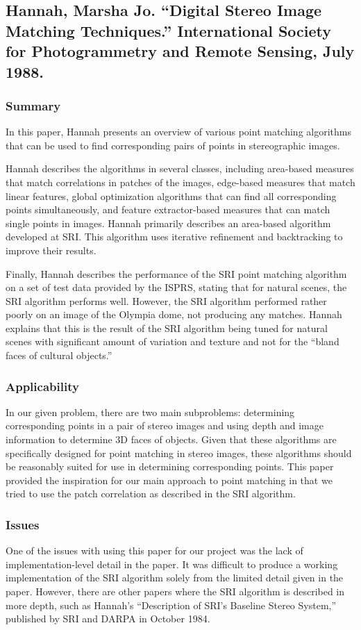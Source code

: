 \subsection{Hannah, Marsha Jo. ``Digital Stereo Image Matching Techniques.'' International Society for Photogrammetry and Remote Sensing, July 1988.}

\subsubsection{Summary}
In this paper, Hannah presents an overview of various point matching algorithms that can be used to find corresponding pairs of points in stereographic images. 

Hannah describes the algorithms in several classes, including area-based measures that match correlations in patches of the images, edge-based measures that match linear features, global optimization algorithms that can find all corresponding points simultaneously, and feature extractor-based measures that can match single points in images. Hannah primarily describes an area-based algorithm developed at SRI. This algorithm uses iterative refinement and backtracking to improve their results. 

Finally, Hannah describes the performance of the SRI point matching algorithm on a set of test data provided by the ISPRS, stating that for natural scenes, the SRI algorithm performs well. However, the SRI algorithm performed rather poorly on an image of the Olympia dome, not producing any matches. Hannah explains that this is the result of the SRI algorithm being tuned for natural scenes with significant amount of variation and texture and not for the ``bland faces of cultural objects.''

\subsubsection{Applicability}
In our given problem, there are two main subproblems: determining corresponding points in a pair of stereo images and using depth and image information to determine 3D faces of objects. Given that these algorithms are specifically designed for point matching in stereo images, these algorithms should be reasonably suited for use in determining corresponding points. This paper provided the inspiration for our main approach to point matching in that we tried to use the patch correlation as described in the SRI algorithm.

\subsubsection{Issues}
One of the issues with using this paper for our project was the lack of implementation-level detail in the paper. It was difficult to produce a working implementation of the SRI algorithm solely from the limited detail given in the paper. However, there are other papers where the SRI algorithm is described in more depth, such as Hannah's ``Description of SRI's Baseline Stereo System,'' published by SRI and DARPA in October 1984. 

